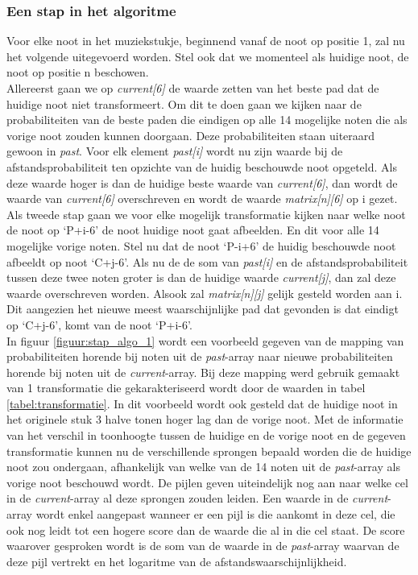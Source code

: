 \subsubsection{Een stap in het algoritme}
Voor elke noot in het muziekstukje, beginnend vanaf de noot op positie 1, zal nu het volgende uitegevoerd worden. Stel ook dat we momenteel als huidige noot, de noot op positie n beschowen.\\ 
Allereerst gaan we op \textit{current[6]} de waarde zetten van het beste pad dat de huidige noot niet transformeert. Om dit te doen gaan we kijken naar de probabiliteiten van de beste paden die eindigen op alle 14 mogelijke noten die als vorige noot zouden kunnen doorgaan. Deze probabiliteiten staan uiteraard gewoon in \textit{past}. Voor elk element \textit{past[i]} wordt nu zijn waarde bij de afstandsprobabiliteit ten opzichte van de huidig beschouwde noot opgeteld. Als deze waarde hoger is dan de huidige beste waarde van \textit{current[6]}, dan wordt de waarde van \textit{current[6]} overschreven en wordt de waarde \textit{matrix[n][6]} op i gezet.
Als tweede stap gaan we voor elke mogelijk transformatie kijken naar welke noot de noot op `P+i-6' de noot huidige noot gaat afbeelden. En dit voor alle 14 mogelijke vorige noten. Stel nu dat de noot `P-i+6' de huidig beschouwde noot afbeeldt op noot `C+j-6'. Als nu de de som van \textit{past[i]} en de afstandsprobabiliteit tussen deze twee noten groter is dan de huidige waarde \textit{current[j]}, dan zal deze waarde overschreven worden. Alsook zal \textit{matrix[n][j]} gelijk gesteld worden aan i. Dit aangezien het nieuwe meest waarschijnlijke pad dat gevonden is dat eindigt op `C+j-6', komt van de noot `P+i-6'.\\
In figuur \ref{figuur:stap_algo_1} wordt een voorbeeld gegeven van de mapping van probabiliteiten horende bij noten uit de \textit{past}-array naar nieuwe probabiliteiten horende bij noten uit de \textit{current}-array. Bij deze mapping werd gebruik gemaakt van 1 transformatie die gekarakteriseerd wordt door de waarden in tabel \ref{tabel:transformatie}. In dit voorbeeld wordt ook gesteld dat de huidige noot in het originele stuk 3 halve tonen hoger lag dan de vorige noot. Met de informatie van het verschil in toonhoogte tussen de huidige en de vorige noot en de gegeven transformatie kunnen nu de verschillende sprongen bepaald worden die de huidige noot zou ondergaan, afhankelijk van welke van de 14 noten uit de \textit{past}-array als vorige noot beschouwd wordt. De pijlen geven uiteindelijk nog aan naar welke cel in de \textit{current}-array al deze sprongen zouden leiden. Een waarde in de \textit{current}-array wordt enkel aangepast wanneer er een pijl is die aankomt in deze cel, die ook nog leidt tot een hogere score dan de waarde die al in die cel staat. De score waarover gesproken wordt is de som van de waarde in de \textit{past}-array waarvan de deze pijl vertrekt en het logaritme van de afstandswaarschijnlijkheid. 
